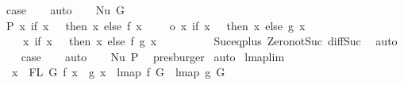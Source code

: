 \begin{isabellebody}
\ {\isacharquery}{\kern0pt}case\isanewline
\ \ \isamarkupfalse%
\ auto\isanewline
{}\isamarkupfalse%
\isanewline
\ \ \isamarkupfalse%
\ {\isacharparenleft}{\kern0pt}Nu\ G{\isacharparenright}{\kern0pt}\isanewline
\ \ \isamarkupfalse%
\ P{}{\isacharcolon}{\kern0pt}\ {\isachardoublequoteopen}{\isacharparenleft}{\kern0pt}{\isasymlambda}x{\isachardot}{\kern0pt}\ if\ x\ {\isacharequal}{\kern0pt}\ {}\ then\ x\ else\ f\ {\isacharparenleft}{\kern0pt}x\ {\isacharminus}{\kern0pt}\ {}{\isacharparenright}{\kern0pt}\ {\isacharplus}{\kern0pt}\ {}{\isacharparenright}{\kern0pt}\ o\ {\isacharparenleft}{\kern0pt}{\isasymlambda}x{\isachardot}{\kern0pt}\ if\ x\ {\isacharequal}{\kern0pt}\ {}\ then\ x\ else\ g\ {\isacharparenleft}{\kern0pt}x\ {\isacharminus}{\kern0pt}\ {}{\isacharparenright}{\kern0pt}\ {\isacharplus}{\kern0pt}\ {}{\isacharparenright}{\kern0pt}\ {\isacharequal}{\kern0pt}\isanewline
\ \ \ \ {\isacharparenleft}{\kern0pt}{\isasymlambda}x{\isachardot}{\kern0pt}\ if\ x\ {\isacharequal}{\kern0pt}\ {}\ then\ x\ else\ f\ {\isacharparenleft}{\kern0pt}g\ {\isacharparenleft}{\kern0pt}x\ {\isacharminus}{\kern0pt}\ {}{\isacharparenright}{\kern0pt}{\isacharparenright}{\kern0pt}\ {\isacharplus}{\kern0pt}\ {}{\isacharparenright}{\kern0pt}{\isachardoublequoteclose}\isanewline
\ \ \ \ \isamarkupfalse%
\ Suc{\isacharunderscore}{\kern0pt}eq{\isacharunderscore}{\kern0pt}plus{}\ Zero{\isacharunderscore}{\kern0pt}not{\isacharunderscore}{\kern0pt}Suc\ diff{\isacharunderscore}{\kern0pt}Suc{\isacharunderscore}{\kern0pt}{}\ \isamarkupfalse%
\ auto\isanewline
\ \ \isamarkupfalse%
\ {\isacharquery}{\kern0pt}case\isanewline
\ \ \isamarkupfalse%
\ auto\isanewline
\ \ \isamarkupfalse%
\ Nu\ P{}\ \isamarkupfalse%
\ presburger\isanewline
{}\isamarkupfalse%
\ auto%
\endisatagproof
{\isafoldproof}%
%
\isadelimproof
\isanewline
%
\endisadelimproof
\isanewline
\isanewline
{}\isamarkupfalse%
\ lmap{\isacharunderscore}{\kern0pt}lim{\isacharcolon}{\kern0pt}\isanewline
\ \ {\isachardoublequoteopen}{\isasymforall}x\ {\isasymin}\ FL\ G{\isachardot}{\kern0pt}\ f\ x\ {\isacharequal}{\kern0pt}\ g\ x\ {\isacharequal}{\kern0pt}{\isacharequal}{\kern0pt}{\isachargreater}{\kern0pt}\ lmap\ f\ G\ {\isacharequal}{\kern0pt}\ lmap\ g\ G{\isachardoublequoteclose}\isanewline

\end{isabellebody}
